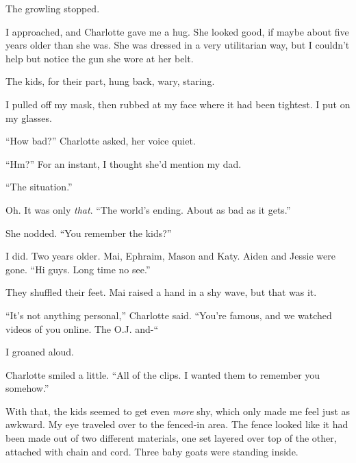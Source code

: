 The growling stopped.



I approached, and Charlotte gave me a hug.  She looked good, if maybe about five years older than she was.  She was dressed in a very utilitarian way, but I couldn't help but notice the gun she wore at her belt.



The kids, for their part, hung back, wary, staring.



I pulled off my mask, then rubbed at my face where it had been tightest.  I put on my glasses.



``How bad?'' Charlotte asked, her voice quiet.



``Hm?''  For an instant, I thought she'd mention my dad.



``The situation.''



Oh.  It was only \emph{that}.  ``The world's ending.  About as bad as it gets.''



She nodded.  ``You remember the kids?''



I did.  Two years older\emph{.  }Mai, Ephraim, Mason and Katy.  Aiden and Jessie were gone.  ``Hi guys.  Long time no see.''



They shuffled their feet.  Mai raised a hand in a shy wave, but that was it.



``It's not anything personal,'' Charlotte said.  ``You're famous, and we watched videos of you online.  The O.J. and-``



I groaned aloud.



Charlotte smiled a little.  ``All of the clips.  I wanted them to remember you somehow.''



With that, the kids seemed to get even \emph{more} shy, which only made me feel just as awkward.  My eye traveled over to the fenced-in area.  The fence looked like it had been made out of two different materials, one set layered over top of the other, attached with chain and cord.  Three baby goats were standing inside.



